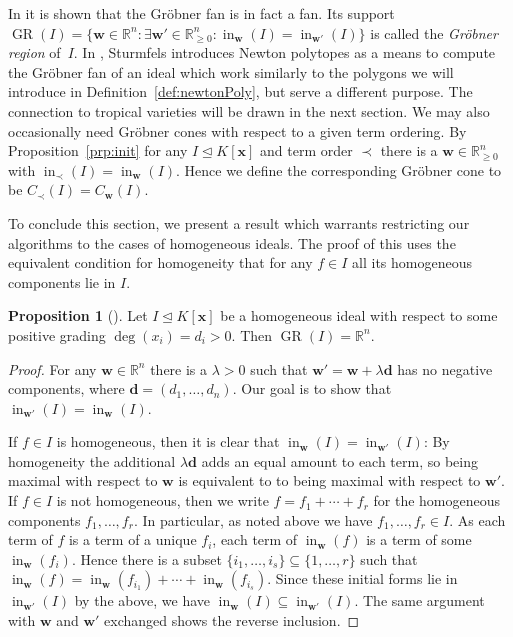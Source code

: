 \documentclass[
  paper=a4,
  titlepage,
  bibliography=totoc,
  pagesize=pdftex
]{scrartcl}
\numberwithin{figure}{section}
\numberwithin{equation}{section}
\numberwithin{table}{section}
\newcommand*\setR{\mathds{R}}
\let\vec\mathbf
\let\idealof\trianglelefteq
\DeclareMathOperator{\initial}{in}
\DeclareMathOperator{\GR}{GR}
\theoremstyle{definition}
\newtheorem{proposition}[definition]{Proposition}
\numberwithin{definition}{section}
\begin{document}
In \cite[Theorem~2.19]{compGrobFan} it is shown that the Gröbner fan is in fact a fan. Its
support $\GR(I) = \{ \vec w \in \setR^n : \exists \vec w' \in \setR^n_{\geq0} :
\initial_{\vec w}(I) = \initial_{\vec w'}(I)\}$ is called the \emph{Gröbner region}
of~$I$. In \cite{SturmGBCP}, Sturmfels introduces Newton polytopes as a means to compute
the Gröbner fan of an ideal which work similarly to the polygons we will introduce in
Definition~\ref{def:newtonPoly}, but serve a different purpose. The connection to tropical
varieties will be drawn in the next section. We may also occasionally need Gröbner cones
with respect to a given term ordering. By Proposition~\ref{prp:init} for any $I \idealof
K[\vec x]$ and term order $\prec$ there is a $\vec w \in \setR^n_{\geq0}$ with
$\initial_\prec(I) = \initial_{\vec w}(I)$. Hence we define the corresponding Gröbner cone
to be $C_\prec(I) = C_{\vec w}(I)$.

To conclude this section, we present a result which warrants restricting our algorithms to
the cases of homogeneous ideals. The proof of this uses the equivalent condition for
homogeneity that for any $f \in I$ all its homogeneous components lie in $I$.

\begin{proposition}[{\cite[Proposition~1.12]{SturmGBCP}}]
  \label{prp:grRegion}
  Let $I \idealof K[\vec x]$ be a homogeneous ideal with respect to some positive grading
  $\deg(x_i) = d_i > 0$. Then $\GR(I) = \setR^n$.
  \begin{proof}
    For any $\vec w \in \setR^n$ there is a $\lambda > 0$ such that $\vec w' = \vec w +
    \lambda \vec d$ has no negative components, where $\vec d = (d_1, \dots, d_n)$. Our
    goal is to show that $\initial_{\vec w'}(I) = \initial_{\vec w}(I)$.

    If $f \in I$ is homogeneous, then it is clear that $\initial_{\vec w}(I) =
    \initial_{\vec w'}(I)$: By homogeneity the additional $\lambda \vec d$ adds an equal
    amount to each term, so being maximal with respect to $\vec w$ is equivalent to to
    being maximal with respect to $\vec w'$. If $f \in I$ is not homogeneous, then we
    write $f = f_1 + \cdots + f_r$ for the homogeneous components $f_1,\dots,f_r$. In
    particular, as noted above we have $f_1, \dots, f_r \in I$. As each term of $f$ is a
    term of a unique $f_i$, each term of $\initial_{\vec w}(f)$ is a term of some
    $\initial_{\vec w}(f_i)$. Hence there is a subset $\{i_1, \dots, i_s\} \subseteq \{1,
    \dots, r\}$ such that $\initial_{\vec w}(f) = \initial_{\vec w}(f_{i_1}) + \cdots +
    \initial_{\vec w}(f_{i_s})$. Since these initial forms lie in $\initial_{\vec w'}(I)$
    by the above, we have $\initial_{\vec w}(I) \subseteq \initial_{\vec w'}(I)$. The same
    argument with $\vec w$ and $\vec w'$ exchanged shows the reverse inclusion.
  \end{proof}
\end{proposition}
\end{document}
